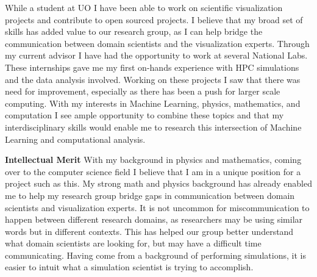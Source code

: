 \documentclass[12pt]{article}
\begin{document}
While a student at UO I have been able to work on scientific visualization
projects and contribute to open sourced projects. I believe that my broad set of
skills has added value to our research group, as I can help bridge the
communication between domain scientists and the visualization experts. Through
my current advisor I have had the opportunity to work at several National Labs.
These internships gave me my first on-hands experience with HPC simulations and
the data analysis involved. Working on these projects I saw that there was need
for improvement, especially as there has been a push for larger scale computing.
With my interests in Machine Learning, physics, mathematics, and computation I
see ample opportunity to combine these topics and that my interdisciplinary
skills would enable me to research this intersection of Machine Learning and
computational analysis.

\textbf{Intellectual Merit}
%
With my background in physics and mathematics, coming over to the computer
science field I believe that I am in a unique position for a project such as
this. My strong math and physics background has already enabled me to help my
research group bridge gaps in communication between domain scientists and
visualization experts. It is not uncommon for miscommunication to happen between
different research domains, as researchers may be using similar words but in
different contexts. This has helped our group better understand what domain
scientists are looking for, but may have a difficult time communicating. Having
come from a background of performing simulations, it is easier to intuit what a
simulation scientist is trying to accomplish.
\end{document}
